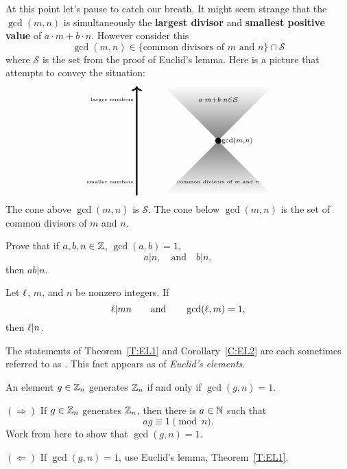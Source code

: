 \documentclass{ximera}
\begin{document}
At this point let's pause to catch our breath. It might seem strange
that the $\gcd(m,n)$ is simultaneously the \textbf{largest divisor} and
\textbf{smallest positive value} of $a\cdot m + b\cdot n$. However
consider this
\[
\gcd(m,n) \in \{\text{common divisors of $m$ and $n$}\}\cap \mathcal{S}
\]
where $\mathcal{S}$ is the set from the proof of Euclid's
lemma. Here is a picture that attempts to convey the situation:
\[
\begin{tikzpicture}
  \draw[white,thin,shading = axis, top color = white, bottom color = gray] (-2,2) -- (0,0)-- (2,2) -- (-2,2) -- cycle;
  \draw[white,thin,shading = axis, bottom color = white, top color = gray] (-2,-2) -- (0,0)-- (2,-2) -- (-2,-2) -- cycle;
  \filldraw (0,0) circle (3pt);
  \node[right] at (0,0) {$\scriptstyle\gcd(m,n)$};
  \node at (0,1.5) {$\scriptstyle a\cdot m + b\cdot n\in\mathcal{S}$};
  \node at (0,-1.5) {\text{\tiny common divisors of $m$ and $n$}};
  \draw[->,ultra thick] (-3,-2) -- (-3,2);
  \node[left] at (-3,-1.5) {\text{\tiny smaller numbers}};
  \node[left] at (-3,1.5) {\text{\tiny larger numbers}};
\end{tikzpicture}
\]
The cone above $\gcd(m,n)$ is $\mathcal{S}$. The cone below
$\gcd(m,n)$ is the set of common divisors of $m$ and $n$.



\begin{exercise}\label{EL1E}
  Prove that if $a,b,n\in\mathbb Z$, $\gcd(a,b) = 1$,
  \[
  a|n, \quad\text{and}\quad b|n,
  \]
  then $ab | n$.
\end{exercise}




\begin{corollary}\label{C:EL2}
  Let $\ell$, $m$, and $n$ be nonzero integers. If
  \[
  \ell|mn\qquad\text{and}\qquad \gcd(\ell,m)=1,
  \]
  then $\ell|n$. 
\end{corollary}


The statements of Theorem~\ref{T:EL1} and Corollary~\ref{C:EL2} are
each sometimes referred to as . This fact appears as  of
\textit{Euclid's elements}.



\begin{corollary}
  An element $g\in \mathbb Z_n$ generates $\mathbb Z_n$ if and only if $\gcd(g,n) =
  1$.
  \begin{sketch}
    $(\Rightarrow)$ If $g\in\mathbb Z_n$ generates $\mathbb Z_n$, then there is
    $a\in\mathbb N$ such that
    \[
    ag \equiv 1\pmod{n}.
    \]
    Work from here to show that $\gcd(g,n) = 1$.
    

    $(\Leftarrow)$ If $\gcd(g,n) = 1$, use Euclid's lemma,
    Theorem~\ref{T:EL1}.
  \end{sketch}
\end{corollary}
\end{document}
